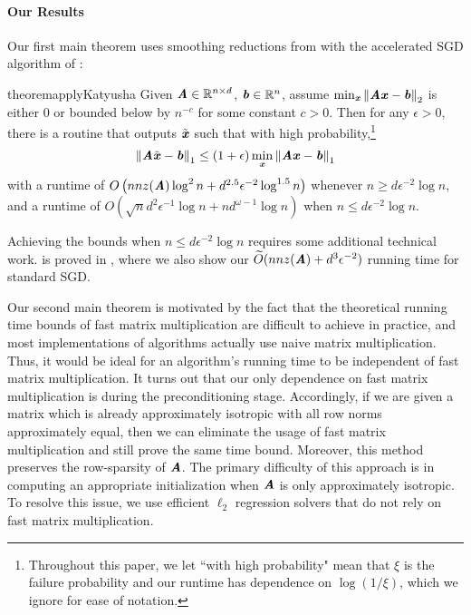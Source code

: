\paragraph{Our Results}
Our first main theorem uses smoothing reductions from \cite{AllenZhuH16} with the accelerated SGD algorithm of \cite{AllenZhu17}:
\begin{restatable}[]{theorem}{applyKatyusha}
  \label{thm:applyKatyusha}
  Given $\AA \in \R^{n\times d}$, $\bb \in \R^n$, assume $\min_{\xx} \norme{\AA \xx - \bb}$ is either 0 or bounded below by $n^{-c}$ for some constant $c>0$. Then for any $\epsilon > 0$, there is a routine that outputs $\tilde{\xx}$ such that with high probability,\footnote{Throughout this paper, we let ``with high probability" mean that $\xi$ is the failure probability and our runtime has dependence on $\log(1/\xi)$, which we ignore for ease of notation.} \[
  \norm{\AA\tilde{\xx} - \bb}_1 \leq (1 + \epsilon)\min_{\xx} \norm{\AA\xx - \bb}_1
  \] 
  with a runtime of $O\left(nnz(\AA)\log^2{n} + d^{2.5}\epsilon^{-2}\log^{1.5}{n}\right)$ whenever $n \geq d\epsilon^{-2}\log{n}$,
  and a runtime of
  $O\left( \sqrt{n}d^2 \epsilon^{-1}\log{n}  + nd^{\omega - 1}\log{n}\right)$ when $n \leq d\epsilon^{-2}\log{n}$.
\end{restatable}
\noindent Achieving the bounds when $n\le d\epsilon^{-2}\log n$ requires some additional technical work.  is proved in , where we also show our $\Otil(nnz(\AA) + d^3\epsilon^{-2})$ running time for standard SGD.



Our second main theorem is motivated by the fact that the theoretical running time bounds of fast matrix multiplication
are difficult to achieve in practice, and most implementations of algorithms actually use naive matrix multiplication. Thus, it would be ideal for an algorithm's running time to be independent of fast matrix multiplication. It turns out that our only dependence on fast matrix multiplication is during the preconditioning stage. 
Accordingly, if we are given a matrix which is already approximately isotropic with all row norms approximately equal, then we can eliminate the usage
of fast matrix multiplication and still prove the same time bound. Moreover, this method preserves the row-sparsity of $\AA$. The primary difficulty of this approach is in computing an appropriate initialization when $\AA$ is only approximately isotropic. To resolve this issue, we use efficient $\ell_2$ regression solvers that do not rely on fast matrix multiplication.

